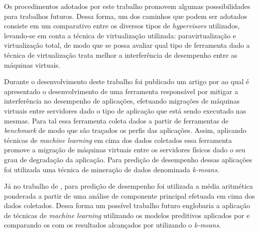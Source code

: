 Os procedimentos adotados por este trabalho promovem algumas posssibilidades para trabalhos futuros. Dessa forma, um dos caminhos que podem ser adotados consiste em um comparativo entre os diversos tipos de \textit{hypervisors} utilizados, levando-se em conta a técnica de virtualização utilizada: paravirtualização e virtualização total, de modo que se possa avaliar qual tipo de ferramenta dado a técnica de virtualização trata melhor a interferência de desempenho entre as máquinas virtuais.

 Durante o desenvolvimento deste trabalho foi publicado um artigo por  ao qual é apresentado o desenvolvimento de uma ferramenta responsável por mitigar a interferência no desempenho de aplicações, efetuando migrações de máquinas virtuais entre servidores dado o tipo de aplicação que está sendo executado nas mesmas. Para tal essa ferramenta coleta dados a partir de ferramentas de \textit{benchmark} de modo que são traçados os perfis das aplicações. Assim, aplicando técnicas de \textit{machine learning} em cima dos dados coletados essa ferramenta promove a migração de máquinas virtuais entre os servidores físicos dado o seu grau de degradação da aplicação. Para predição de desempenho dessas aplicações foi utilizada uma técnica de mineração de dados denominada \textit{k-means}.
 
Já no trabalho de , para predição de desempenho foi utilizada a média aritmética ponderada a partir de uma análise de componente principal efetuada em cima dos dados coletados. Dessa forma um possível trabalho futuro englobaria a aplicação de técnicas de \textit{machine learning} utilizando os modelos preditivos aplicados por  e comparando os com os resultados alcançados por  utilizando o \textit{k-means}.





\



